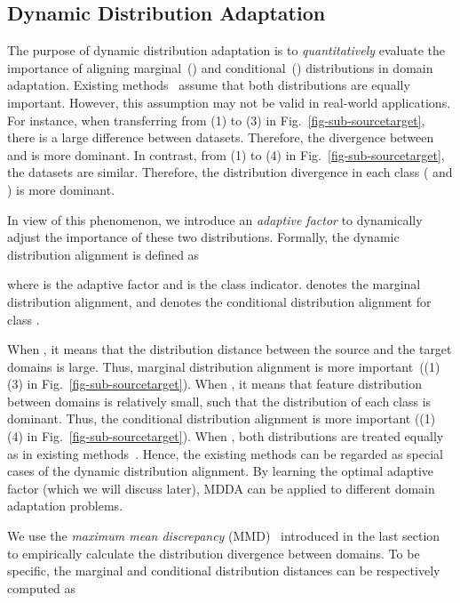 \documentclass[acmsmall]{acmart}
\begin{document}
\subsection{Dynamic Distribution Adaptation}
\label{sec-da}

The purpose of dynamic distribution adaptation is to \textit{quantitatively} evaluate the importance of aligning marginal~() and conditional~() distributions in domain adaptation.
Existing methods~\cite{long2013transfer,zhang2017joint} assume that both distributions are equally important. However, this assumption may not be valid in real-world applications. For instance, when transferring from (1) to (3) in Fig.~\ref{fig-sub-sourcetarget}, there is a large difference between datasets. Therefore, the divergence between  and  is more dominant. In contrast, from (1) to (4) in Fig.~\ref{fig-sub-sourcetarget}, the datasets are similar. Therefore, the distribution divergence in each class ( and ) is more dominant. 

In view of this phenomenon, we introduce an \textit{adaptive factor} to dynamically adjust the importance of these two distributions. Formally, the dynamic distribution alignment  is defined as

where  is the adaptive factor and  is the class indicator.  denotes the marginal distribution alignment, and  denotes the conditional distribution alignment for class .

When , it means that the distribution distance between the source and the target domains is large. Thus, marginal distribution alignment is more important~((1)  (3) in Fig.~\ref{fig-sub-sourcetarget}). When , it means that feature distribution between domains is relatively small, such that the distribution of each class is dominant. Thus, the conditional distribution alignment is more important ((1)  (4) in Fig.~\ref{fig-sub-sourcetarget}). When , both distributions are treated equally as in existing methods~\cite{long2013transfer,zhang2017joint}. Hence, the existing methods can be regarded as special cases of the dynamic distribution alignment. By learning the optimal adaptive factor  (which we will discuss later), MDDA can be applied to different domain adaptation problems.

We use the \textit{maximum mean discrepancy} (MMD)~\cite{ben2007analysis} introduced in the last section to empirically calculate the distribution divergence between domains. To be specific, the marginal and conditional distribution distances can be respectively computed as
\end{document}
